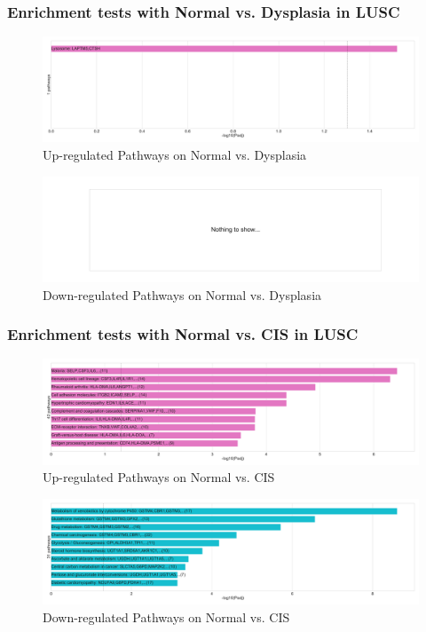 \documentclass{beamer}
\begin{document}
    \begin{frame}
        \frametitle{Enrichment tests with Normal vs. Dysplasia in LUSC}

        \begin{figure}
            \includegraphics[width=0.8 \linewidth]{figures/DEG/Enrichment/STAR.FPKM.SQC.Normal-Dysplasia.Up.KEGG.pdf}
            \caption{Up-regulated Pathways on Normal vs. Dysplasia}
        \end{figure}

        \begin{figure}
            \includegraphics[width=0.8 \linewidth]{figures/DEG/Enrichment/STAR.FPKM.SQC.Normal-Dysplasia.Down.KEGG.pdf}
            \caption{Down-regulated Pathways on Normal vs. Dysplasia}
        \end{figure}
    \end{frame}

    \begin{frame}
        \frametitle{Enrichment tests with Normal vs. CIS in LUSC}

        \begin{figure}
            \includegraphics[width=0.8 \linewidth]{figures/DEG/Enrichment/STAR.FPKM.SQC.Normal-CIS.Up.KEGG.pdf}
            \caption{Up-regulated Pathways on Normal vs. CIS}
        \end{figure}

        \begin{figure}
            \includegraphics[width=0.8 \linewidth]{figures/DEG/Enrichment/STAR.FPKM.SQC.Normal-CIS.Down.KEGG.pdf}
            \caption{Down-regulated Pathways on Normal vs. CIS}
        \end{figure}
    \end{frame}
\end{document}
